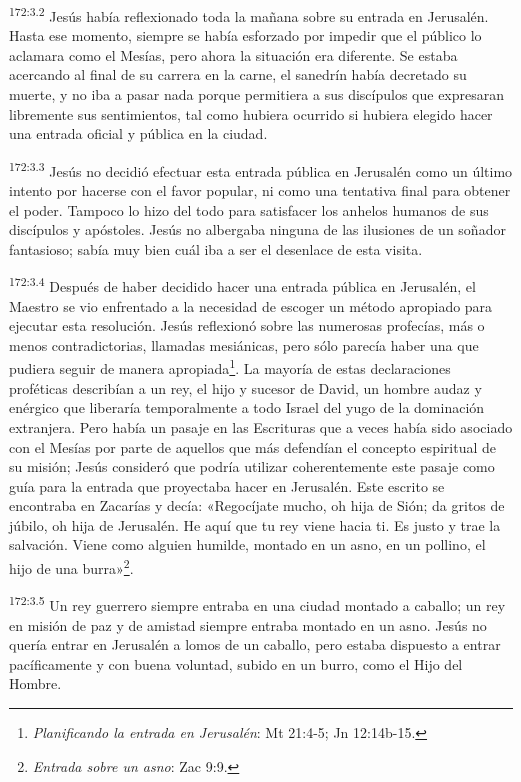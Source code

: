 \par
\textsuperscript{172:3.2} Jesús había reflexionado toda la mañana sobre su entrada en Jerusalén. Hasta ese momento, siempre se había esforzado por impedir que el público lo aclamara como el Mesías, pero ahora la situación era diferente. Se estaba acercando al final de su carrera en la carne, el sanedrín había decretado su muerte, y no iba a pasar nada porque permitiera a sus discípulos que expresaran libremente sus sentimientos, tal como hubiera ocurrido si hubiera elegido hacer una entrada oficial y pública en la ciudad.

\par
\textsuperscript{172:3.3} Jesús no decidió efectuar esta entrada pública en Jerusalén como un último intento por hacerse con el favor popular, ni como una tentativa final para obtener el poder. Tampoco lo hizo del todo para satisfacer los anhelos humanos de sus discípulos y apóstoles. Jesús no albergaba ninguna de las ilusiones de un soñador fantasioso; sabía muy bien cuál iba a ser el desenlace de esta visita.

\par
\textsuperscript{172:3.4} Después de haber decidido hacer una entrada pública en Jerusalén, el Maestro se vio enfrentado a la necesidad de escoger un método apropiado para ejecutar esta resolución. Jesús reflexionó sobre las numerosas profecías, más o menos contradictorias, llamadas mesiánicas, pero sólo parecía haber una que pudiera seguir de manera apropiada\footnote{\textit{Planificando la entrada en Jerusalén}: Mt 21:4-5; Jn 12:14b-15.}. La mayoría de estas declaraciones proféticas describían a un rey, el hijo y sucesor de David, un hombre audaz y enérgico que liberaría temporalmente a todo Israel del yugo de la dominación extranjera. Pero había un pasaje en las Escrituras que a veces había sido asociado con el Mesías por parte de aquellos que más defendían el concepto espiritual de su misión; Jesús consideró que podría utilizar coherentemente este pasaje como guía para la entrada que proyectaba hacer en Jerusalén. Este escrito se encontraba en Zacarías y decía: «Regocíjate mucho, oh hija de Sión; da gritos de júbilo, oh hija de Jerusalén. He aquí que tu rey viene hacia ti. Es justo y trae la salvación. Viene como alguien humilde, montado en un asno, en un pollino, el hijo de una burra»\footnote{\textit{Entrada sobre un asno}: Zac 9:9.}.

\par
\textsuperscript{172:3.5} Un rey guerrero siempre entraba en una ciudad montado a caballo; un rey en misión de paz y de amistad siempre entraba montado en un asno. Jesús no quería entrar en Jerusalén a lomos de un caballo, pero estaba dispuesto a entrar pacíficamente y con buena voluntad, subido en un burro, como el Hijo del Hombre.

